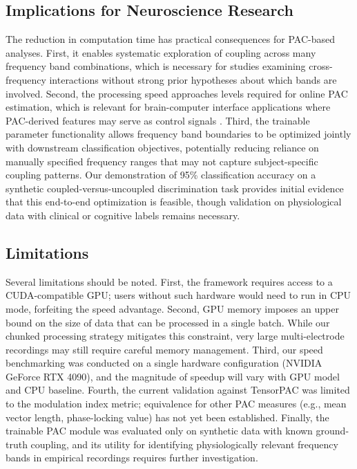 \subsection{Implications for Neuroscience Research}
The reduction in computation time has practical consequences for PAC-based analyses. First, it enables systematic exploration of coupling across many frequency band combinations, which is necessary for studies examining cross-frequency interactions without strong prior hypotheses about which bands are involved. Second, the processing speed approaches levels required for online PAC estimation, which is relevant for brain-computer interface applications where PAC-derived features may serve as control signals \cite{canolty_high_2006}. Third, the trainable parameter functionality allows frequency band boundaries to be optimized jointly with downstream classification objectives, potentially reducing reliance on manually specified frequency ranges that may not capture subject-specific coupling patterns. Our demonstration of 95\% classification accuracy on a synthetic coupled-versus-uncoupled discrimination task provides initial evidence that this end-to-end optimization is feasible, though validation on physiological data with clinical or cognitive labels remains necessary.

\subsection{Limitations}
Several limitations should be noted. First, the framework requires access to a CUDA-compatible GPU; users without such hardware would need to run in CPU mode, forfeiting the speed advantage. Second, GPU memory imposes an upper bound on the size of data that can be processed in a single batch. While our chunked processing strategy mitigates this constraint, very large multi-electrode recordings may still require careful memory management. Third, our speed benchmarking was conducted on a single hardware configuration (NVIDIA GeForce RTX 4090), and the magnitude of speedup will vary with GPU model and CPU baseline. Fourth, the current validation against TensorPAC was limited to the modulation index metric; equivalence for other PAC measures (e.g., mean vector length, phase-locking value) has not yet been established. Finally, the trainable PAC module was evaluated only on synthetic data with known ground-truth coupling, and its utility for identifying physiologically relevant frequency bands in empirical recordings requires further investigation.

